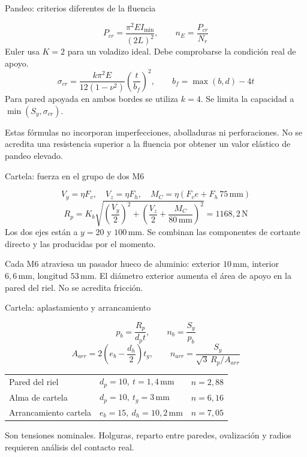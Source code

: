 \documentclass[10pt,aspectratio=169]{beamer}
\newcommand{\mm}{\,\mathrm{mm}}
\newcommand{\N}{\,\mathrm{N}}
\newcommand{\mcref}{Guía de diseño}
\begin{document}
\gdef\mcref{Mathcad: sección 7 / pág. 8}
\begin{frame}[t]{Pandeo: criterios diferentes de la fluencia}

\[
P_{cr}=\frac{\pi^2E I_{\min}}{(2L)^2},\qquad n_E=\frac{P_{cr}}{N_r}
\]
Euler usa $K=2$ para un voladizo ideal. Debe comprobarse la condición real de apoyo.
\[
\sigma_{cr}=\frac{k\pi^2E}{12(1-\nu^2)}\left(\frac{t}{b_f}\right)^2,
\qquad b_f=\max(b,d)-4t
\]
Para pared apoyada en ambos bordes se utiliza $k=4$. Se limita la capacidad a $\min(S_y,\sigma_{cr})$.

Estas fórmulas no incorporan imperfecciones, abolladuras ni perforaciones. No se acredita una resistencia superior a la fluencia por obtener un valor elástico de pandeo elevado.

\end{frame}

\gdef\mcref{Mathcad: sección 9 / pág. 11-12}
\begin{frame}[t]{Cartela: fuerza en el grupo de dos M6}

\[
V_y=\eta F_v,\quad V_z=\eta F_h,\quad
M_C=\eta(F_ve+F_h\,75\mm)
\]
\[
R_p=K_b\sqrt{\left(\frac{V_y}{2}\right)^2+
\left(\frac{V_z}{2}+\frac{M_C}{80\mm}\right)^2}
=1168{,}2\N
\]
Los dos ejes están a $y=20$ y $100\mm$. Se combinan las componentes de cortante directo y las producidas por el momento.

Cada M6 atraviesa un pasador hueco de aluminio: exterior $10\mm$, interior $6{,}6\mm$, longitud $53\mm$. El diámetro exterior aumenta el área de apoyo en la pared del riel. No se acredita fricción.

\end{frame}

\gdef\mcref{Mathcad: sección 9 / pág. 11-12}
\begin{frame}[t]{Cartela: aplastamiento y arrancamiento}

\[
p_b=\frac{R_p}{d_p t},\qquad n_b=\frac{S_y}{p_b}
\]
\[
A_{arr}=2\left(e_b-\frac{d_h}{2}\right)t_g,
\qquad n_{arr}=\frac{S_y}{\sqrt3\,R_p/A_{arr}}
\]
\begin{center}\begin{tabular}{lll}\toprule
Pared del riel & $d_p=10,\ t=1{,}4\mm$ & $n=2{,}88$\\
Alma de cartela & $d_p=10,\ t_g=3\mm$ & $n=6{,}16$\\
Arrancamiento cartela & $e_b=15,\ d_h=10{,}2\mm$ & $n=7{,}05$\\\bottomrule\end{tabular}\end{center}
Son tensiones nominales. Holguras, reparto entre paredes, ovalización y radios requieren análisis del contacto real.

\end{frame}
\end{document}
